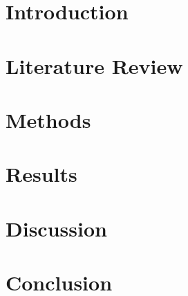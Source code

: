 \documentclass[oneside,12pt]{report}
\begin{document}

\clearpage

\clearpage

\clearpage

\clearpage
\tableofcontents
\clearpage
\listoffigures
\clearpage
\listoftables
\clearpage
\pagestyle{main}

\chapter{Introduction}

\chapter{Literature Review}

\chapter{Methods}

\chapter{Results}

\chapter{Discussion}

\chapter{Conclusion}


\clearpage
\printbibliography[heading=bibintoc,title=References]

\clearpage
\begin{appendices}

\end{appendices}
\end{document}
